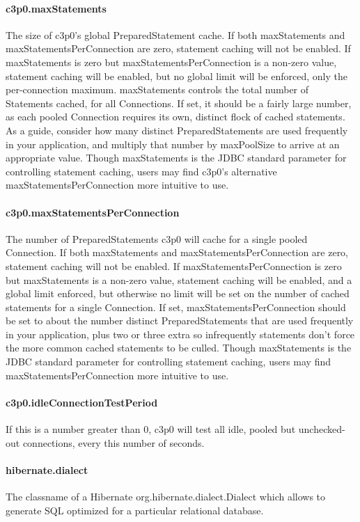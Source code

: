 \documentclass[12pt,a4paper]{report}
\begin{document}
\paragraph{c3p0.maxStatements}
The size of c3p0's global PreparedStatement cache. If both maxStatements and
maxStatementsPerConnection are zero, statement caching will not be enabled.
If maxStatements is zero but maxStatementsPerConnection is a non-zero value,
statement caching will be enabled, but no global limit will be enforced, only
the per-connection maximum. maxStatements controls the total number of Statements
cached, for all Connections. If set, it should be a fairly large number, as each
pooled Connection requires its own, distinct flock of cached statements. As a guide,
consider how many distinct PreparedStatements are used frequently in your application,
and multiply that number by maxPoolSize to arrive at an appropriate value. Though
maxStatements is the JDBC standard parameter for controlling statement caching,
users may find c3p0's alternative maxStatementsPerConnection more intuitive to use.

\paragraph{c3p0.maxStatementsPerConnection}
The number of PreparedStatements c3p0 will cache for a single pooled Connection.
If both maxStatements and maxStatementsPerConnection are zero, statement caching
will not be enabled. If maxStatementsPerConnection is zero but maxStatements is
a non-zero value, statement caching will be enabled, and a global limit enforced,
but otherwise no limit will be set on the number of cached statements for a single
Connection. If set, maxStatementsPerConnection should be set to about the number
distinct PreparedStatements that are used frequently in your application, plus
two or three extra so infrequently statements don't force the more common cached
statements to be culled. Though maxStatements is the JDBC standard parameter for
controlling statement caching, users may find maxStatementsPerConnection more
intuitive to use.

\paragraph{c3p0.idleConnectionTestPeriod}
If this is a number greater than 0, c3p0 will test all idle, pooled but unchecked-out
connections, every this number of seconds.

\paragraph{hibernate.dialect}
The classname of a Hibernate org.hibernate.dialect.Dialect which allows to generate
SQL optimized for a particular relational database.
\end{document}
